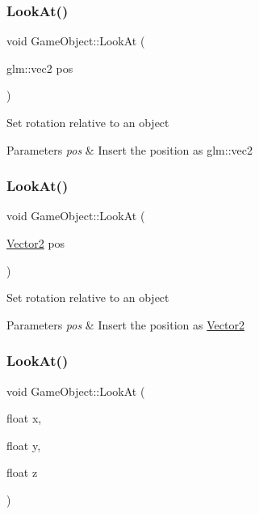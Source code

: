 \subsubsection{\texorpdfstring{LookAt()}{LookAt()}\hspace{0.1cm}{\footnotesize\ttfamily [3/5]}}
{\footnotesize\ttfamily void Game\+Object\+::\+Look\+At (\begin{DoxyParamCaption}\item[{glm\+::vec2}]{pos }\end{DoxyParamCaption})}

Set rotation relative to an object 
\begin{DoxyParams}{Parameters}
{\em pos} & Insert the position as glm\+::vec2 \\
\hline
\end{DoxyParams}
\mbox{\label{class_game_object_a806d41ea17cfb5cd02def9b6d3942249}} 
\subsubsection{\texorpdfstring{LookAt()}{LookAt()}\hspace{0.1cm}{\footnotesize\ttfamily [4/5]}}
{\footnotesize\ttfamily void Game\+Object\+::\+Look\+At (\begin{DoxyParamCaption}\item[{\mbox{\hyperlink{struct_vector2}{Vector2}}}]{pos }\end{DoxyParamCaption})}

Set rotation relative to an object 
\begin{DoxyParams}{Parameters}
{\em pos} & Insert the position as \mbox{\hyperlink{struct_vector2}{Vector2}} \\
\hline
\end{DoxyParams}
\mbox{\label{class_game_object_a54974c5e887f6a8873c8ee861a0c9e5f}} 
\subsubsection{\texorpdfstring{LookAt()}{LookAt()}\hspace{0.1cm}{\footnotesize\ttfamily [5/5]}}
{\footnotesize\ttfamily void Game\+Object\+::\+Look\+At (\begin{DoxyParamCaption}\item[{float}]{x,  }\item[{float}]{y,  }\item[{float}]{z }\end{DoxyParamCaption})}

